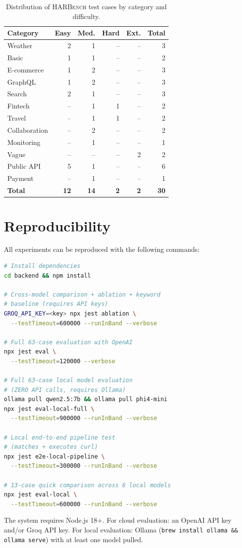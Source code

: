 \documentclass[10pt,twocolumn]{article}
\begin{document}
\begin{table}[H]
\centering
\caption{Distribution of \textsc{HARBench} test cases by category and difficulty.}
\label{tab:distribution}
\scriptsize
\begin{tabular}{@{}l r r r r r@{}}
\toprule
\textbf{Category} & \textbf{Easy} & \textbf{Med.} & \textbf{Hard} & \textbf{Ext.} & \textbf{Total} \\
\midrule
Weather       & 2 & 1 & -- & -- & 3 \\
Basic         & 1 & 1 & -- & -- & 2 \\
E-commerce    & 1 & 2 & -- & -- & 3 \\
GraphQL       & 1 & 2 & -- & -- & 3 \\
Search        & 2 & 1 & -- & -- & 3 \\
Fintech       & -- & 1 & 1 & -- & 2 \\
Travel        & -- & 1 & 1 & -- & 2 \\
Collaboration & -- & 2 & -- & -- & 2 \\
Monitoring    & -- & 1 & -- & -- & 1 \\
Vague         & -- & -- & -- & 2  & 2 \\
Public API    & 5 & 1 & -- & -- & 6 \\
Payment       & -- & 1 & -- & -- & 1 \\
\midrule
\textbf{Total} & \textbf{12} & \textbf{14} & \textbf{2} & \textbf{2} & \textbf{30} \\
\bottomrule
\end{tabular}
\end{table}

\section{Reproducibility}

All experiments can be reproduced with the following commands:

\begin{lstlisting}[language=bash]
# Install dependencies
cd backend && npm install

# Cross-model comparison + ablation + keyword
# baseline (requires API keys)
GROQ_API_KEY=<key> npx jest ablation \
  --testTimeout=600000 --runInBand --verbose

# Full 63-case evaluation with OpenAI
npx jest eval \
  --testTimeout=120000 --verbose

# Full 63-case local model evaluation
# (ZERO API calls, requires Ollama)
ollama pull qwen2.5:7b && ollama pull phi4-mini
npx jest eval-local-full \
  --testTimeout=900000 --runInBand --verbose

# Local end-to-end pipeline test
# (matches + executes curl)
npx jest e2e-local-pipeline \
  --testTimeout=300000 --runInBand --verbose

# 13-case quick comparison across 6 local models
npx jest eval-local \
  --testTimeout=600000 --runInBand --verbose
\end{lstlisting}

The system requires Node.js 18+. For cloud evaluation: an OpenAI API key and/or Groq API key. For local evaluation: Ollama (\texttt{brew install ollama \&\& ollama serve}) with at least one model pulled.
\end{document}
